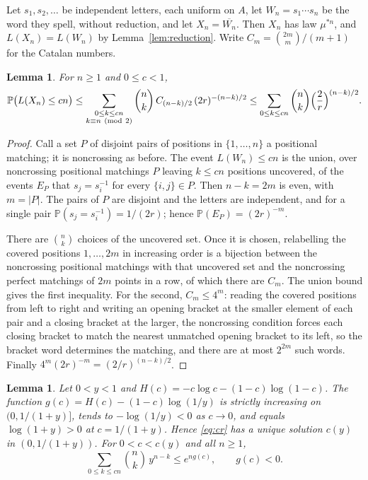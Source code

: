 \documentclass[11pt]{amsart}
\newtheorem{lemma}[theorem]{Lemma}
\theoremstyle{definition}
\theoremstyle{remark}
\numberwithin{equation}{section}
\newcommand{\Pp}{\mathbb P}
\begin{document}
Let $s_1,s_2,\dots$ be independent letters, each uniform on $A$, let $W_n=s_1\cdots s_n$ be the word they spell, without reduction, and let $X_n=\overline{W_n}$. Then $X_n$ has law $\mu^{*n}$, and $L(X_n)=L(W_n)$ by Lemma~\ref{lem:reduction}. Write $C_m=\binom{2m}{m}/(m+1)$ for the Catalan numbers.

\begin{lemma}\label{lem:count}
For $n\ge1$ and $0\le c<1$,
\[
\Pp\bigl(L(X_n)\le cn\bigr)\le\sum_{\substack{0\le k\le cn\\ k\equiv n\ (\mathrm{mod}\ 2)}}\binom nk\,C_{(n-k)/2}\,(2r)^{-(n-k)/2}
\le\sum_{0\le k\le cn}\binom nk\Bigl(\frac2r\Bigr)^{(n-k)/2}.
\]
\end{lemma}

\begin{proof}
Call a set $P$ of disjoint pairs of positions in $\{1,\dots,n\}$ a positional matching; it is noncrossing as before. The event $L(W_n)\le cn$ is the union, over noncrossing positional matchings $P$ leaving $k\le cn$ positions uncovered, of the events $E_P$ that $s_j=s_i^{-1}$ for every $\{i,j\}\in P$. Then $n-k=2m$ is even, with $m=|P|$. The pairs of $P$ are disjoint and the letters are independent, and for a single pair $\Pp(s_j=s_i^{-1})=1/(2r)$; hence $\Pp(E_P)=(2r)^{-m}$.

There are $\binom nk$ choices of the uncovered set. Once it is chosen, relabelling the covered positions $1,\dots,2m$ in increasing order is a bijection between the noncrossing positional matchings with that uncovered set and the noncrossing perfect matchings of $2m$ points in a row, of which there are $C_m$. The union bound gives the first inequality. For the second, $C_m\le4^m$: reading the covered positions from left to right and writing an opening bracket at the smaller element of each pair and a closing bracket at the larger, the noncrossing condition forces each closing bracket to match the nearest unmatched opening bracket to its left, so the bracket word determines the matching, and there are at most $2^{2m}$ such words. Finally $4^m(2r)^{-m}=(2/r)^{(n-k)/2}$.
\end{proof}

\begin{lemma}\label{lem:chernoff}
Let $0<y<1$ and $H(c)=-c\log c-(1-c)\log(1-c)$. The function $g(c)=H(c)-(1-c)\log(1/y)$ is strictly increasing on $(0,1/(1+y)]$, tends to $-\log(1/y)<0$ as $c\to0$, and equals $\log(1+y)>0$ at $c=1/(1+y)$. Hence \eqref{eq:cr} has a unique solution $c(y)$ in $(0,1/(1+y))$. For $0<c<c(y)$ and all $n\ge1$,
\[
\sum_{0\le k\le cn}\binom nk\,y^{n-k}\le e^{ng(c)},\qquad g(c)<0 .
\]
\end{lemma}
\end{document}
